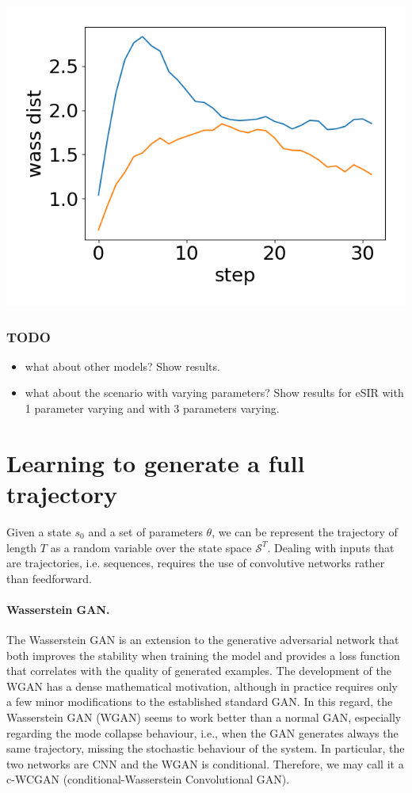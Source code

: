 \documentclass{article}
\begin{document}
    \begin{center}
        \includegraphics[scale = 0.3]{new_img/eSIR_orig_dataset_avg_wass_distance_32steps.png}
    \end{center}

\subsubsection{TODO}
\begin{itemize}
    \item what about other models? Show results.
    \item  what about the scenario with varying parameters? Show results for eSIR with 1 parameter varying and with 3 parameters varying.
\end{itemize}

\section{Learning to generate a full trajectory}

Given a state $s_0$ and a set of parameters $\theta$, we can be represent the trajectory of length $T$ as a random variable over the state space $\mathcal{S}^T$. Dealing with inputs that are trajectories, i.e. sequences, requires the use of convolutive networks rather than feedforward. 

\paragraph{Wasserstein GAN.} The Wasserstein GAN is an extension to the generative adversarial network that both improves the stability when training the model and provides a loss function that correlates with the quality of generated examples. 
The development of the WGAN has a dense mathematical motivation, although in practice requires only a few minor modifications to the established standard GAN.
In this regard, the Wasserstein GAN (WGAN) seems to work better than a normal GAN, especially regarding the mode collapse behaviour, i.e., when the GAN generates always the same trajectory, missing the stochastic behaviour of the system. 
In particular, the two networks are CNN and the WGAN is conditional. Therefore, we may call it a c-WCGAN (conditional-Wasserstein Convolutional GAN).
\end{document}
